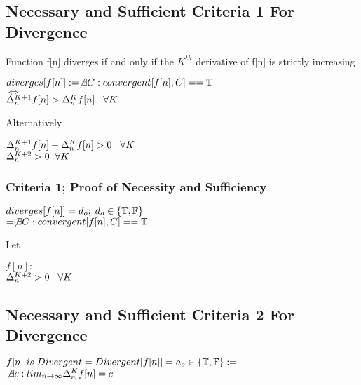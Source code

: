 \documentclass[11pt]{article}
\begin{document}
\subsection{Necessary and Sufficient Criteria 1 For Divergence}
Function f[n] diverges if and only if the $K^{th}$ derivative of f[n] is strictly increasing
\vspace{1mm}
\begin{center}
$
diverges \lbrack f \lbrack n \rbrack \rbrack := \not \exists C : convergent[f[n],C] == \mathbb{T}
$
\\ \vspace{4mm}
$
\Longleftrightarrow
$
\\ \vspace{4mm}
$
\Delta_n^{K+1} f[n] > \Delta_n^{K}f[n] \hspace{3mm} \forall K
$
\end{center}
Alternatively
\begin{center}
$
\Delta_n^{K+1} f[n] - \Delta_n^{K}f[n] > 0 \hspace{3mm} \forall K
$
\\ \vspace{4mm}
$
\Delta_{n}^{K+2} > 0 \hspace{2mm} \forall K
$
\end{center}






\subsubsection{Criteria 1; Proof of Necessity and Sufficiency}
\begin{center}
$
diverges \lbrack f \lbrack n \rbrack \rbrack = d_o; \hspace{1mm} d_o \in \{\mathbb{T},\mathbb{F}\}
$
\\ \vspace{4mm}
$
= \not \exists C : convergent[f[n],C] == \mathbb{T}
$
\end{center}
Let
\begin{center}
$
f[n] :
$
\\ \vspace{2mm}
$
\Delta_{n}^{K+2} > 0 \hspace{3mm} \forall K
$
\end{center}




\subsection{Necessary and Sufficient Criteria 2 For Divergence}
\begin{center}
\vspace{2mm}
$
f[n]\hspace{1mm} is \hspace{1mm} Divergent = Divergent[f[n]] = a_o \in \{\mathbb{T},\mathbb{F}\} :=
$
\\ \vspace{4mm}
$
\not \exists c: lim_{n\rightarrow \infty} \Delta_n^K f[n] = c
$
\end{center}
\end{document}
